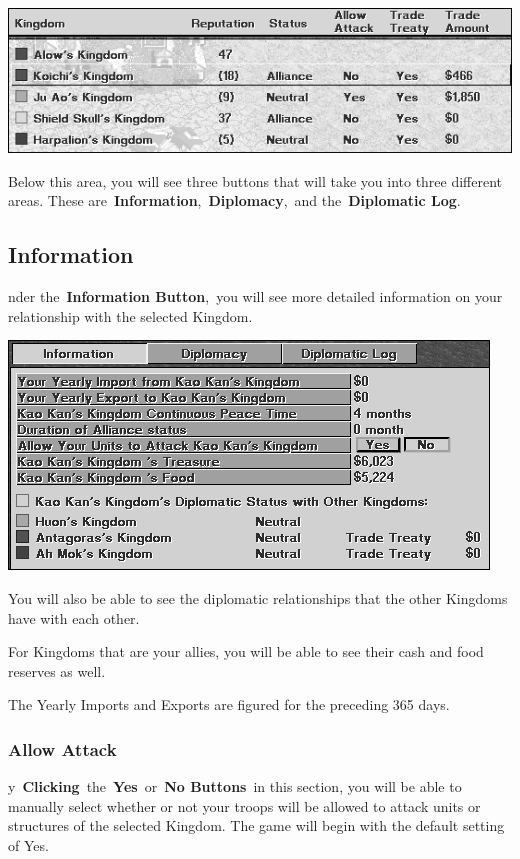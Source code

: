 \begin{center}
	\includegraphics[width=0.7\linewidth]{Ikingdoms}
\end{center}

Below this area, you will see three buttons that will take you into three different areas. These are \textbf{Information}, \textbf{Diplomacy}, and the \textbf{Diplomatic Log}.

\subsection{Information}

nder the \textbf{Information Button}, you will see more detailed information on your relationship with the selected Kingdom.

\begin{center}
	\includegraphics[width=0.7\linewidth]{Ikingdoms_information}
\end{center}

You will also be able to see the diplomatic relationships that the other Kingdoms have with each other.

For Kingdoms that are your allies, you will be able to see their cash and food reserves as well.

The Yearly Imports and Exports are figured for the preceding 365 days.

\subsubsection{Allow Attack}


y \textbf{Clicking} the \textbf{Yes} or \textbf{No Buttons} in this section, you will be able to manually select whether or not your troops will be allowed to attack units or structures of the selected Kingdom. The game will begin with the default setting of Yes.

